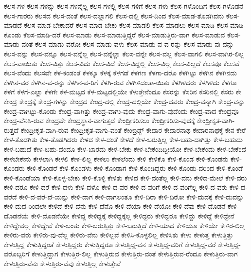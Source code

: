 {ಕೆಲಸ-ಗಳ
ಕೆಲಸ-ಗಳನ್ನು
ಕೆಲಸ-ಗಳನ್ನೆಲ್ಲ
ಕೆಲಸ-ಗಳಲ್ಲಿ
ಕೆಲಸ-ಗಳಿಗೆ
ಕೆಲಸ-ಗಳು
ಕೆಲಸ-ಗಳೊಂದಿಗೆ
ಕೆಲಸ-ಗಳೊಡನೆ
ಕೆಲಸ-ಗಾರರು
ಕೆಲಸದ
ಕೆಲಸ-ದಂತೆ
ಕೆಲಸ-ದಲ್ಲಾಗಲಿ
ಕೆಲಸ-ದಲ್ಲಿ
ಕೆಲಸ-ದಿಂದ
ಕೆಲಸ-ಮಾಡ-ತೊಡಗಿದನು
ಕೆಲಸ-ಮಾಡದೆ
ಕೆಲಸ-ಮಾಡ-ಬೇಕಾದರೆ
ಕೆಲಸ-ಮಾಡ-ಬೇಕು
ಕೆಲಸ-ಮಾಡಲಿ
ಕೆಲಸ-ಮಾಡಲು
ಕೆಲಸ-ಮಾಡಿ
ಕೆಲಸ-ಮಾಡಿ-ಕೊಂಡು
ಕೆಲಸ-ಮಾಡಿ-ದರೆ
ಕೆಲಸ-ಮಾಡು
ಕೆಲಸ-ಮಾಡುತ್ತಿದ್ದರೆ
ಕೆಲಸ-ಮಾಡುತ್ತಿರು-ವಾಗ
ಕೆಲಸ-ಮಾಡುವ
ಕೆಲಸ-ಮಾಡು-ವಂತೆ
ಕೆಲಸ-ಮಾಡು-ವರೋ
ಕೆಲಸ-ಮಾಡು-ವಳು
ಕೆಲಸ-ಮಾಡು-ವ-ವ-ರನ್ನು
ಕೆಲಸ-ಮಾಡು-ವು-ದನ್ನು
ಕೆಲಸ-ವನ್ನು
ಕೆಲಸ-ವನ್ನೂ
ಕೆಲಸ-ವನ್ನೆಲ್ಲ
ಕೆಲಸ-ವನ್ನೆಲ್ಲಾ
ಕೆಲಸ-ವನ್ನೇ
ಕೆಲಸ-ವಲ್ಲ
ಕೆಲಸ-ವಾಗಲಿ
ಕೆಲಸ-ವಾಗಿರ-ಲಿಲ್ಲ
ಕೆಲಸ-ವಾಯಿತು
ಕೆಲಸ-ವಿತ್ತು
ಕೆಲಸ-ವಿದು
ಕೆಲಸ-ವಿದೆ
ಕೆಲಸ-ವಿದ್ದಲ್ಲಿ
ಕೆಲಸ-ವಿಲ್ಲ
ಕೆಲಸ-ವಿಲ್ಲದೆ
ಕೆಲಸವೂ
ಕೆಲಸವೆ
ಕೆಲಸ-ವೆಂದು
ಕೆಲಸವೇ
ಕೆಳ-ಕಂಡಂತೆ
ಕೆಳಕ್ಕೂ
ಕೆಳಕ್ಕೆ
ಕೆಳಗಡೆ
ಕೆಳಗಣ
ಕೆಳಗಾ-ದರೊ
ಕೆಳಗಿಟ್ಟು
ಕೆಳಗಿನ
ಕೆಳಗಿನದು
ಕೆಳಗಿನ-ವರ
ಕೆಳಗಿನ-ವ-ರನ್ನು
ಕೆಳಗಿನ-ವ-ರಿಗೆ
ಕೆಳಗಿ-ರುವ
ಕೆಳಗಿಳಿದಂತಾ-ಯಿತು
ಕೆಳಗಿಳಿದರು
ಕೆಳಗಿಳಿದು
ಕೆಳಗೂ
ಕೆಳಗೆ
ಕೆಳಗೆ-ಎಲ್ಲಾ
ಕೆಳಗೇ
ಕೆಳ-ಮಟ್ಟದ
ಕೆಳ-ಮಟ್ಟದಲ್ಲಿಯೇ
ಕೆಳುತ್ತೇನೆಂದೂ
ಕೆಸರನ್ನು
ಕೆಸರಿನ
ಕೆಸರಿನಲ್ಲಿ
ಕೆಸರು
ಕೇ
ಕೇಂದ್ರ
ಕೇಂದ್ರಕ್ಕೆ
ಕೇಂದ್ರ-ಗಳನ್ನು
ಕೇಂದ್ರದ
ಕೇಂದ್ರ-ದಲ್ಲಿ
ಕೇಂದ್ರ-ದಲ್ಲಿಯೇ
ಕೇಂದ್ರ-ದವರು
ಕೇಂದ್ರ-ವನ್ನಾಗಿ
ಕೇಂದ್ರ-ವನ್ನು
ಕೇಂದ್ರ-ವಾಗಿಟ್ಟು-ಕೊಂಡು
ಕೇಂದ್ರ-ವಾಗಿತ್ತು
ಕೇಂದ್ರ-ವಾಗು-ವುದು
ಕೇಂದ್ರ-ವಾಗು-ವುದೆಂದು
ಕೇಂದ್ರ-ವಾದ
ಕೇಂದ್ರವೂ
ಕೇಂದ್ರ-ವೆನಿಸಿ-ರುವ
ಕೇಂದ್ರವೇ
ಕೇಂದ್ರಸ್ಥಾನ-ವಾಗುತ್ತದೆ
ಕೇಂದ್ರೀಕರಿಸಲು
ಕೇಂದ್ರೀಕರಿಸು-ವುದಕ್ಕೆ
ಕೇಂದ್ರೀಕೃತ-ವಾಗಿ-ರುತ್ತದೆ
ಕೇಂದ್ರೀಕೃತ-ವಾಗಿ-ರುವ
ಕೇಂದ್ರೀಕೃತ-ವಾಗು-ವಂತೆ
ಕೇಂಬ್ರಿಡ್ಜ್
ಕೇದಾರ
ಕೇದಾರನಾಥ
ಕೇದಾರನಾಥಕ್ಕೆ
ಕೇನ
ಕೇರೆ
ಕೇಳ-ತೊಡಗಿತು
ಕೇಳ-ತೊಡಗಿದರು
ಕೇಳದ
ಕೇಳ-ದಂತೆ
ಕೇಳದೆ
ಕೇಳ-ಬರುತ್ತಿಲ್ಲ
ಕೇಳ-ಬಹು-ದಾಗಿತ್ತು
ಕೇಳ-ಬಹುದು
ಕೇಳ-ಬಹುದೆ
ಕೇಳ-ಬಹು-ದೆಂದೂ
ಕೇಳ-ಬಾರದು
ಕೇಳ-ಬೇಕು
ಕೇಳ-ಬೇಕೆಂದಿದ್ದೀಯೋ
ಕೇಳ-ಬೇಕೆಂದು
ಕೇಳ-ಬೇಕೆಂದೆ
ಕೇಳಬೇಕೇನು
ಕೇಳಲಾಗಿ
ಕೇಳಲಿ
ಕೇಳ-ಲಿಲ್ಲ
ಕೇಳಲು
ಕೇಳಲೆಂದು
ಕೇಳಿ
ಕೇಳಿಕೊ
ಕೇಳಿ-ಕೊಂಡ
ಕೇಳಿ-ಕೊಂಡನು
ಕೇಳಿ-ಕೊಂಡರು
ಕೇಳಿ-ಕೊಂಡರೆ
ಕೇಳಿ-ಕೊಂಡಳು
ಕೇಳಿ-ಕೊಂಡಾಗ
ಕೇಳಿ-ಕೊಂಡಿದ್ದರು
ಕೇಳಿ-ಕೊಂಡು-ದರಿಂದ
ಕೇಳಿ-ಕೊಂಡೆ
ಕೇಳಿ-ಕೊಂಡೆಯಾ
ಕೇಳಿ-ಕೊಳ್ಳ-ಬೇಕು
ಕೇಳಿ-ಕೊಳ್ಳಿ
ಕೇಳಿತು
ಕೇಳಿದ
ಕೇಳಿ-ದಂತೆಲ್ಲ
ಕೇಳಿ-ದನು
ಕೇಳಿದ-ಮೇಲೆ
ಕೇಳಿ-ದರು
ಕೇಳಿ-ದರೂ
ಕೇಳಿ-ದರೆ
ಕೇಳಿ-ದಳು
ಕೇಳಿ-ದಳೊ
ಕೇಳಿ-ದ-ವರ
ಕೇಳಿ-ದ-ವರಿಗೆ
ಕೇಳಿ-ದ-ವರಿಗೆಲ್ಲ
ಕೇಳಿ-ದ-ವರು
ಕೇಳಿ-ದ-ವರೆದೆ
ಕೇಳಿ-ದ-ವರೆ-ದೆ-ಯನ್ನು
ಕೇಳಿ-ದಾಗ
ಕೇಳಿ-ದಾಗಲಂತೂ
ಕೇಳಿ-ದಿರಾ
ಕೇಳಿ-ದಿರೋ
ಕೇಳಿ-ದುದಕ್ಕೆ
ಕೇಳಿ-ದುದನ್ನು
ಕೇಳಿ-ದುದ-ರಿಂದಲೇ
ಕೇಳಿದೆ
ಕೇಳಿ-ದೆನು
ಕೇಳಿ-ದೆನೊ
ಕೇಳಿ-ದೆಯಾ
ಕೇಳಿ-ದೆಯೋ
ಕೇಳಿ-ದೆವು
ಕೇಳಿ-ದೊಡನೆ
ಕೇಳಿ-ದೊಡನೆಯೆ
ಕೇಳಿ-ದೊಡನೆಯೇ
ಕೇಳಿದ್ದ
ಕೇಳಿದ್ದಕ್ಕೆ
ಕೇಳಿದ್ದಕ್ಕೆಲ್ಲ
ಕೇಳಿದ್ದರು
ಕೇಳಿದ್ದರೂ
ಕೇಳಿದ್ದು
ಕೇಳಿದ್ದೆ
ಕೇಳಿದ್ದೇನೆ
ಕೇಳಿದ್ದೇವಲ್ಲ
ಕೇಳಿದ್ದೇವೆ
ಕೇಳಿ-ಬಂತು
ಕೇಳಿ-ಬರುತ್ತಿತ್ತು
ಕೇಳಿ-ಬರುತ್ತಿದೆ
ಕೇಳಿ-ಯಾದ
ಕೇಳಿಯೂ
ಕೇಳಿಯೇ
ಕೇಳಿರ-ಲಿಲ್ಲ
ಕೇಳಿರು-ವರು
ಕೇಳಿರು-ವು-ದೆಲ್ಲ
ಕೇಳಿರು-ವೆನು
ಕೇಳಿಲ್ಲವೆ
ಕೇಳಿಸಿ-ಕೊಳ್ಳಲಿಲ್ಲ
ಕೇಳಿಸಿತು
ಕೇಳು
ಕೇಳುತ್ತ
ಕೇಳುತ್ತಿತ್ತು
ಕೇಳುತ್ತಿದ್ದ
ಕೇಳುತ್ತಿದ್ದಂತೆ
ಕೇಳುತ್ತಿದ್ದರು
ಕೇಳುತ್ತಿದ್ದರೂ
ಕೇಳುತ್ತಿದ್ದ-ವನ
ಕೇಳುತ್ತಿದ್ದ-ವರಿಗೆ
ಕೇಳುತ್ತಿದ್ದ-ವರೆ
ಕೇಳುತ್ತಿದ್ದ-ವರೊಬ್ಬರಿಗೆ
ಕೇಳುತ್ತಿದ್ದಾಗ
ಕೇಳುತ್ತಿರ-ಲಿಲ್ಲ
ಕೇಳುತ್ತಿರುವ
ಕೇಳುತ್ತಿರು-ವಂತೆ
ಕೇಳುತ್ತಿರುವ-ರೆಂದೂ
ಕೇಳುತ್ತಿರು-ವಾಗ
ಕೇಳುತ್ತಿರು-ವೆನು
ಕೇಳುತ್ತಿರು-ವೆವು
ಕೇಳುತ್ತಿಲ್ಲ
ಕೇಳುತ್ತೇವೆ
}
